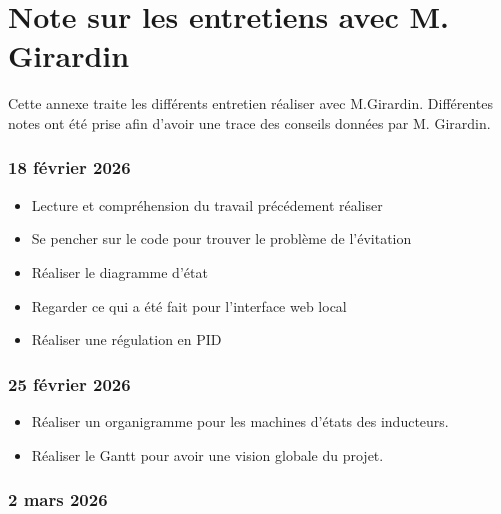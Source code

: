 \chapter{Note sur les entretiens avec M. Girardin}
Cette annexe traite les différents entretien réaliser avec M.Girardin. Différentes notes ont été prise afin d'avoir une trace des conseils données par M. Girardin.


\subsection*{18 février 2026}

\begin{itemize}
    \item Lecture et compréhension du travail précédement réaliser

    \item Se pencher sur le code pour trouver le problème de l'évitation

    \item Réaliser le diagramme d'état

    \item Regarder ce qui a été fait pour l'interface web local

    \item Réaliser une régulation en PID
\end{itemize}

\subsection*{25 février 2026}

\begin{itemize}
    \item Réaliser un organigramme pour les machines d'états des inducteurs.

    \item Réaliser le Gantt pour avoir une vision globale du projet.
\end{itemize}

\subsection*{2 mars 2026}

